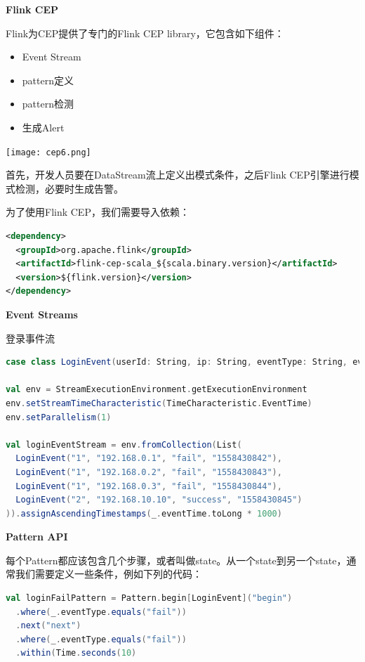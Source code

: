 \documentclass[oneside]{ctexbook}
\begin{document}
\textbf{Flink CEP}

Flink为CEP提供了专门的Flink CEP library，它包含如下组件：

\begin{itemize}
\item Event Stream
\item pattern定义
\item pattern检测
\item 生成Alert
\end{itemize}

\noindent \texttt{[image: cep6.png]}

首先，开发人员要在DataStream流上定义出模式条件，之后Flink CEP引擎进行模式检测，必要时生成告警。

为了使用Flink CEP，我们需要导入依赖：

\begin{lstlisting}[language=xml]
<dependency>
  <groupId>org.apache.flink</groupId>
  <artifactId>flink-cep-scala_${scala.binary.version}</artifactId>
  <version>${flink.version}</version>
</dependency>
\end{lstlisting}

\textbf{Event Streams}

登录事件流

\begin{lstlisting}[language=scala]
case class LoginEvent(userId: String, ip: String, eventType: String, eventTime: String)

val env = StreamExecutionEnvironment.getExecutionEnvironment
env.setStreamTimeCharacteristic(TimeCharacteristic.EventTime)
env.setParallelism(1)

val loginEventStream = env.fromCollection(List(
  LoginEvent("1", "192.168.0.1", "fail", "1558430842"),
  LoginEvent("1", "192.168.0.2", "fail", "1558430843"),
  LoginEvent("1", "192.168.0.3", "fail", "1558430844"),
  LoginEvent("2", "192.168.10.10", "success", "1558430845")
)).assignAscendingTimestamps(_.eventTime.toLong * 1000)
\end{lstlisting}

\textbf{Pattern API}

每个Pattern都应该包含几个步骤，或者叫做state。从一个state到另一个state，通常我们需要定义一些条件，例如下列的代码：

\begin{lstlisting}[language=scala]
val loginFailPattern = Pattern.begin[LoginEvent]("begin")
  .where(_.eventType.equals("fail"))
  .next("next")
  .where(_.eventType.equals("fail"))
  .within(Time.seconds(10)
\end{lstlisting}
\end{document}
